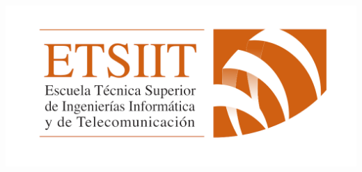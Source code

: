\documentclass[12pt, spanish]{article}
\makeatletter
\let\thedate\@date
\makeatother
\begin{document}
\begin{titlepage}
	 \includegraphics[scale = 0.20]{logo_etsiit.png}\\[0.3 cm]
    {\large \thedate}\\[0.75cm]
    \doclicenseThis
\end{titlepage}



\pagestyle{fancy}




\tableofcontents
\pagebreak




\end{document}

